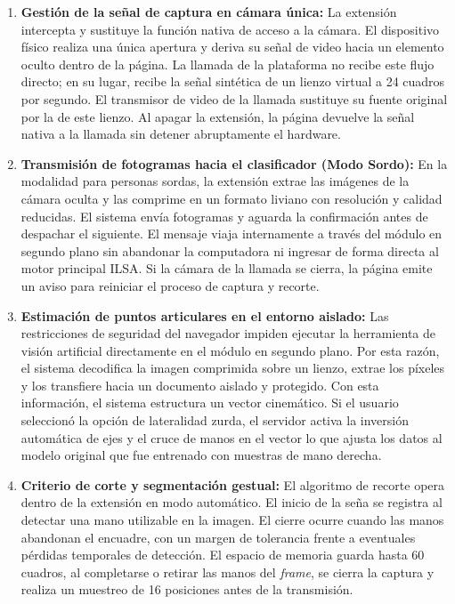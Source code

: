 \begin{enumerate}
\item \textbf{Gestión de la señal de captura en cámara única:}
La extensión intercepta y sustituye la función nativa de acceso a la cámara. El dispositivo físico realiza una única apertura y deriva su señal de video hacia un elemento oculto dentro de la página. La llamada de la plataforma no recibe este flujo directo; en su lugar, recibe la señal sintética de un lienzo virtual a 24 cuadros por segundo. El transmisor de video de la llamada sustituye su fuente original por la de este lienzo. Al apagar la extensión, la página devuelve la señal nativa a la llamada sin detener abruptamente el hardware.

\item \textbf{Transmisión de fotogramas hacia el clasificador (Modo Sordo):} 
En la modalidad para personas sordas, la extensión extrae las imágenes de la cámara oculta y las comprime en un formato liviano con resolución y calidad reducidas. El sistema envía fotogramas y aguarda la confirmación antes de despachar el siguiente. El mensaje viaja internamente a través del módulo en segundo plano sin abandonar la computadora ni ingresar de forma directa al motor principal ILSA. Si la cámara de la llamada se cierra, la página emite un aviso para reiniciar el proceso de captura y recorte.

\item \textbf{Estimación de puntos articulares en el entorno aislado:} 
Las restricciones de seguridad del navegador impiden ejecutar la herramienta de visión artificial directamente en el módulo en segundo plano. Por esta razón, el sistema decodifica la imagen comprimida sobre un lienzo, extrae los píxeles y los transfiere hacia un documento aislado y protegido. Con esta información, el sistema estructura un vector cinemático. Si el usuario seleccionó la opción de lateralidad zurda, el servidor activa la inversión automática de ejes y el cruce de manos en el vector lo que ajusta los datos al modelo original que fue entrenado con muestras de mano derecha.

\item \textbf{Criterio de corte y segmentación gestual:} 
El algoritmo de recorte opera dentro de la extensión en modo automático. El inicio de la seña se registra al detectar una mano utilizable en la imagen. El cierre ocurre cuando las manos abandonan el encuadre, con un margen de tolerancia frente a eventuales pérdidas temporales de detección. El espacio de memoria guarda hasta 60 cuadros, al completarse o retirar las manos del \textit{frame}, se cierra la captura y realiza un muestreo de 16 posiciones antes de la transmisión.


\end{enumerate}

